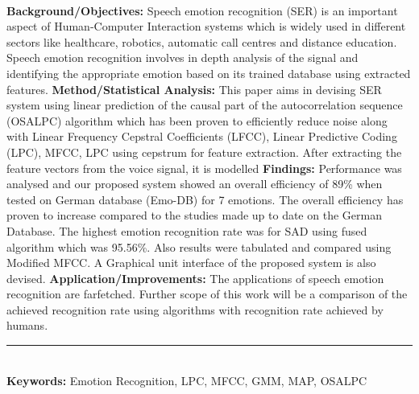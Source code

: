 \documentclass[10pt,a4paper]{article}
\begin{document}
\begin{shaded}
{}\\
\fontsize{9pt}{13pt}\selectfont
\textbf{Background/Objectives:} Speech emotion recognition (SER) is an important aspect of Human-Computer Interaction systems which is widely used in different sectors like healthcare, robotics, automatic call centres and distance education.
Speech emotion recognition involves in depth analysis of the signal and identifying the appropriate emotion based on
its trained database using extracted features. \textbf{Method/Statistical Analysis:} This paper aims in devising SER system
using linear prediction of the causal part of the autocorrelation sequence (OSALPC) algorithm which has been proven
to efficiently reduce noise along with Linear Frequency Cepstral Coefficients (LFCC), Linear Predictive Coding (LPC),
MFCC, LPC using cepstrum for feature extraction. After extracting the feature vectors from the voice signal, it is modelled \textbf{Findings:}
Performance was analysed and our proposed system showed an overall efficiency of 89\% when tested on German database
(Emo-DB) for 7 emotions. The overall efficiency has proven to increase compared to the studies made up to date on the
German Database. The highest emotion recognition rate was for SAD using fused algorithm which was 95.56\%. Also results
were tabulated and compared using Modified MFCC. A Graphical unit interface of the proposed system is also devised.
\textbf{Application/Improvements:} The applications of speech emotion recognition are farfetched. Further scope of this work
will be a comparison of the achieved recognition rate using algorithms with recognition rate achieved by humans.
\end{shaded}
\vspace{-0,7cm}
{\color{tieude}\rule{17cm}{0,1pt}}\\
{\color{tieude}\textbf{Keywords:}} Emotion Recognition, LPC, MFCC, GMM, MAP, OSALPC
\end{document}
